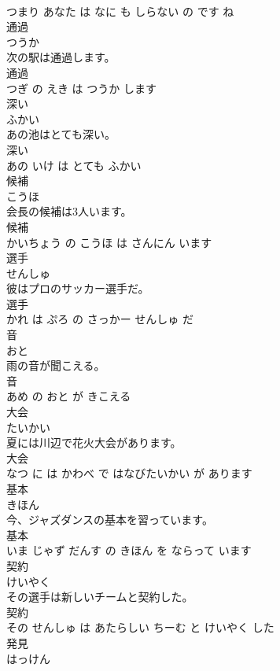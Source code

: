 \documentclass[8pt]{extreport}
\begin{document}
\begin{CJK}{UTF8}{min}
\\	つまり あなた は なに も しらない の です ね			
\\	通過	
\\	つうか			
\\	次の駅は通過します。	
\\	通過 
\\	つぎ の えき は つうか します			
\\	深い	
\\	ふかい			
\\	あの池はとても深い。	
\\	深い 
\\	あの いけ は とても ふかい			
\\	候補	
\\	こうほ			
\\	会長の候補は3人います。	
\\	候補 
\\	かいちょう の こうほ は さんにん います			
\\	選手	
\\	せんしゅ			
\\	彼はプロのサッカー選手だ。	
\\	選手 
\\	かれ は ぷろ の さっかー せんしゅ だ			
\\	音	
\\	おと			
\\	雨の音が聞こえる。	
\\	音 
\\	あめ の おと が きこえる			
\\	大会	
\\	たいかい			
\\	夏には川辺で花火大会があります。	
\\	大会 
\\	なつ に は かわべ で はなびたいかい が あります			
\\	基本	
\\	きほん			
\\	今、ジャズダンスの基本を習っています。	
\\	基本 
\\	いま じゃず だんす の きほん を ならって います			
\\	契約	
\\	けいやく			
\\	その選手は新しいチームと契約した。	
\\	契約 
\\	その せんしゅ は あたらしい ちーむ と けいやく した			
\\	発見	
\\	はっけん			

\end{CJK}
\end{document}
